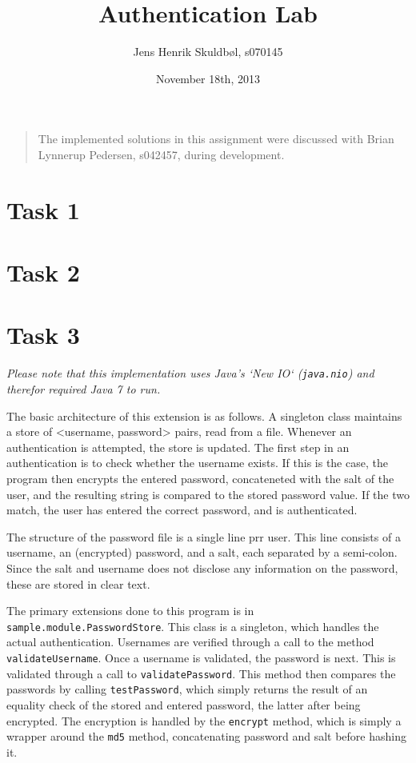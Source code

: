 \documentclass{article}
\title{Authentication Lab}
\author{Jens Henrik Skuldbøl, s070145}
\date{November 18th, 2013}
\begin{document}
\maketitle
\thispagestyle{empty}

\begin{quote}
	The implemented solutions in this assignment were discussed
	with Brian Lynnerup Pedersen, s042457, during development.
\end{quote}

\newpage

\section{Task 1}

\section{Task 2}

\section{Task 3}
\emph{Please note that this implementation uses Java's `New IO` (\emph{\texttt{java.nio}}) 
and therefor required Java 7 to run.}

The basic architecture of this extension is as follows.
A singleton class maintains a store of <username, password> pairs, read from a file.
Whenever an authentication is attempted, the store is updated.
The first step in an authentication is to check whether the username exists.
If this is the case, the program then encrypts the entered password, concateneted
with the salt of the user, and the resulting string is compared to the stored password value.
If the two match, the user has entered the correct password, and is authenticated.

The structure of the password file is a single line prr user.
This line consists of a username, an (encrypted) password, and a salt, each separated by a semi-colon.
Since the salt and username does not disclose any information on the password, 
these are stored in clear text.

The primary extensions done to this program is in \texttt{sample.module.PasswordStore}.
This class is a singleton, which handles the actual authentication.
Usernames are verified through a call to the method \texttt{validateUsername}.
Once a username is validated, the password is next.
This is validated through a call to \texttt{validatePassword}.
This method then compares the passwords by calling \texttt{testPassword},
which simply returns the result of an equality check of the stored and entered password,
the latter after being encrypted.
The encryption is handled by the \texttt{encrypt} method, which is simply a wrapper around 
the \texttt{md5} method, concatenating password and salt before hashing it.
\end{document}
